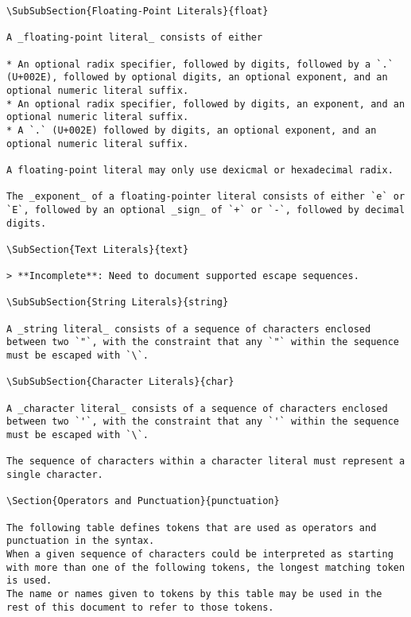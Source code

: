 \begin{verbatim}
\SubSubSection{Floating-Point Literals}{float}

A _floating-point literal_ consists of either

* An optional radix specifier, followed by digits, followed by a `.` (U+002E), followed by optional digits, an optional exponent, and an optional numeric literal suffix.
* An optional radix specifier, followed by digits, an exponent, and an optional numeric literal suffix.
* A `.` (U+002E) followed by digits, an optional exponent, and an optional numeric literal suffix.

A floating-point literal may only use dexicmal or hexadecimal radix.

The _exponent_ of a floating-pointer literal consists of either `e` or `E`, followed by an optional _sign_ of `+` or `-`, followed by decimal digits.

\SubSection{Text Literals}{text}

> **Incomplete**: Need to document supported escape sequences.

\SubSubSection{String Literals}{string}

A _string literal_ consists of a sequence of characters enclosed between two `"`, with the constraint that any `"` within the sequence must be escaped with `\`.

\SubSubSection{Character Literals}{char}

A _character literal_ consists of a sequence of characters enclosed between two `'`, with the constraint that any `'` within the sequence must be escaped with `\`.

The sequence of characters within a character literal must represent a single character.

\Section{Operators and Punctuation}{punctuation}

The following table defines tokens that are used as operators and punctuation in the syntax.
When a given sequence of characters could be interpreted as starting with more than one of the following tokens, the longest matching token is used.
The name or names given to tokens by this table may be used in the rest of this document to refer to those tokens.


\end{verbatim}
